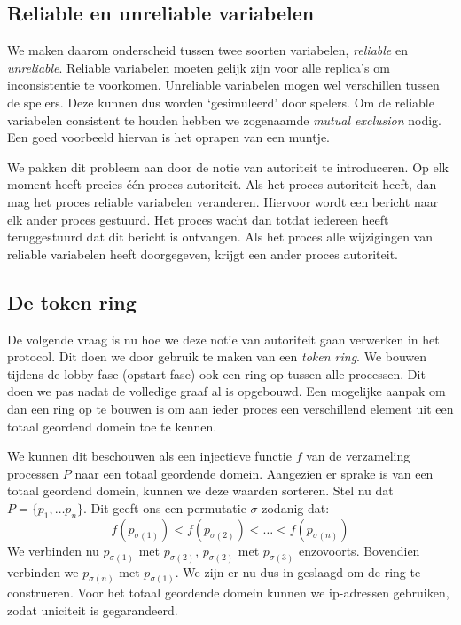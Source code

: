     \subsection{Reliable en unreliable variabelen}
    We maken daarom onderscheid tussen twee soorten variabelen, \emph{reliable} en \emph{unreliable}. Reliable variabelen moeten gelijk zijn voor alle replica's om inconsistentie te voorkomen. Unreliable variabelen mogen wel verschillen tussen de spelers. Deze kunnen dus worden `gesimuleerd' door spelers. Om de reliable variabelen consistent te houden hebben we zogenaamde \emph{mutual exclusion} nodig. Een goed voorbeeld hiervan is het oprapen van een muntje.

    We pakken dit probleem aan door de notie van autoriteit te introduceren. Op elk moment heeft precies \'e\'en proces autoriteit. Als het proces autoriteit heeft, dan mag het proces reliable variabelen veranderen. Hiervoor wordt een bericht naar elk ander proces gestuurd. Het proces wacht dan totdat iedereen heeft teruggestuurd dat dit bericht is ontvangen. Als het proces alle wijzigingen van reliable variabelen heeft doorgegeven, krijgt een ander proces autoriteit.

    \subsection{De token ring}
    De volgende vraag is nu hoe we deze notie van autoriteit gaan verwerken in het protocol. Dit doen we door gebruik te maken van een \emph{token ring}. We bouwen tijdens de lobby fase (opstart fase) ook een ring op tussen alle processen. Dit doen we pas nadat de volledige graaf al is opgebouwd. Een mogelijke aanpak om dan een ring op te bouwen is om aan ieder proces een verschillend element uit een totaal geordend domein toe te kennen.

    We kunnen dit beschouwen als een injectieve functie $f$ van de verzameling processen $P$ naar een totaal geordende domein. Aangezien er sprake is van een totaal geordend domein, kunnen we deze waarden sorteren. Stel nu dat $P = \{ p_1, \ldots p_n\}$. Dit geeft ons een permutatie $\sigma$ zodanig dat:
    \[
    f(p_{\sigma(1)}) < f(p_{\sigma(2)}) < \ldots < f(p_{\sigma(n)})
    \]
    We verbinden nu $p_{\sigma(1)}$ met $p_{\sigma(2)}$, $p_{\sigma(2)}$ met $p_{\sigma(3)}$ enzovoorts. Bovendien verbinden we $p_{\sigma(n)}$ met $p_{\sigma(1)}$. We zijn er nu dus in geslaagd om de ring te construeren. Voor het totaal geordende domein kunnen we ip-adressen gebruiken, zodat uniciteit is gegarandeerd.


